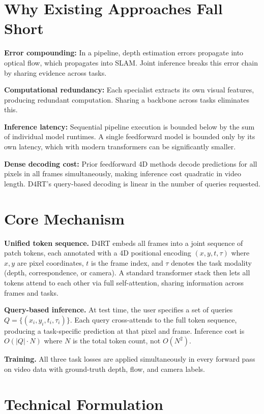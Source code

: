 \documentclass[10pt,twocolumn]{article}
\begin{document}
\section{Why Existing Approaches Fall Short}

\textbf{Error compounding:} In a pipeline, depth estimation errors propagate
into optical flow, which propagates into SLAM. Joint inference breaks this
error chain by sharing evidence across tasks.

\textbf{Computational redundancy:} Each specialist extracts its own visual
features, producing redundant computation. Sharing a backbone across tasks
eliminates this.

\textbf{Inference latency:} Sequential pipeline execution is bounded below
by the sum of individual model runtimes. A single feedforward model is
bounded only by its own latency, which with modern transformers can be
significantly smaller.

\textbf{Dense decoding cost:} Prior feedforward 4D methods decode predictions
for all pixels in all frames simultaneously, making inference cost quadratic
in video length. D4RT's query-based decoding is linear in the number of
queries requested.

\section{Core Mechanism}

\textbf{Unified token sequence.} D4RT embeds all frames into a joint sequence
of patch tokens, each annotated with a 4D positional encoding
$(x, y, t, \tau)$ where $x, y$ are pixel coordinates, $t$ is the frame index,
and $\tau$ denotes the task modality (depth, correspondence, or camera).
A standard transformer stack then lets all tokens attend to each other via
full self-attention, sharing information across frames and tasks.

\textbf{Query-based inference.} At test time, the user specifies a set of
queries $Q = \{(x_i, y_i, t_i, \tau_i)\}$. Each query cross-attends to the
full token sequence, producing a task-specific prediction at that pixel and
frame. Inference cost is $O(|Q| \cdot N)$ where $N$ is the total token count,
not $O(N^2)$.

\textbf{Training.} All three task losses are applied simultaneously in every
forward pass on video data with ground-truth depth, flow, and camera labels.

\section{Technical Formulation}
\end{document}
